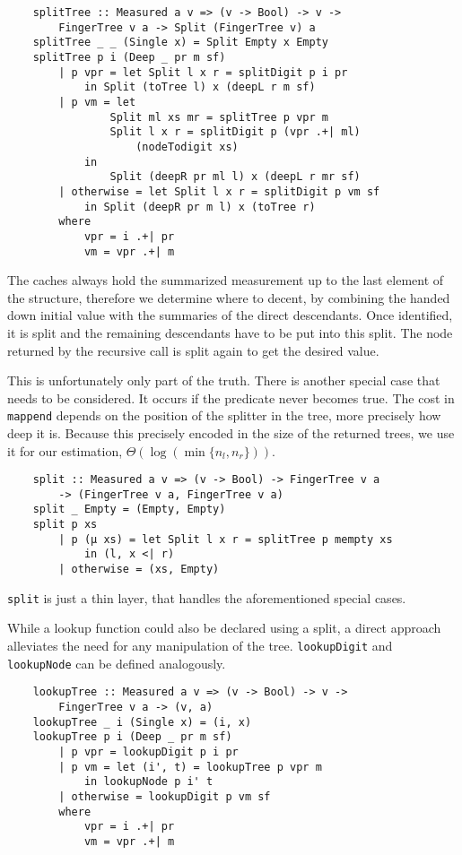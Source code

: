 \begin{verbatim}
    splitTree :: Measured a v => (v -> Bool) -> v ->
        FingerTree v a -> Split (FingerTree v) a
    splitTree _ _ (Single x) = Split Empty x Empty
    splitTree p i (Deep _ pr m sf)
        | p vpr = let Split l x r = splitDigit p i pr 
            in Split (toTree l) x (deepL r m sf)
        | p vm = let
                Split ml xs mr = splitTree p vpr m
                Split l x r = splitDigit p (vpr .+| ml)
                    (nodeTodigit xs)
            in
                Split (deepR pr ml l) x (deepL r mr sf)
        | otherwise = let Split l x r = splitDigit p vm sf
            in Split (deepR pr m l) x (toTree r)
        where
            vpr = i .+| pr
            vm = vpr .+| m
\end{verbatim}

The caches always hold the summarized measurement up to the last element of the structure, therefore we determine where to decent, by combining the handed down initial value with the summaries of the direct descendants. Once identified, it is split and the remaining descendants have to be put into this split. The node returned by the recursive call is split again to get the desired value.\par
This is unfortunately only part of the truth. There is another special case that needs to be considered. It occurs if the predicate never becomes true.
The cost in \texttt{mappend} depends on the position of the splitter in the tree,  more precisely how deep it is. Because this precisely encoded in the size of the returned trees, we use it for our estimation, \(\Theta(\log(\min\{n_l,n_r\}))\).

\begin{verbatim}
    split :: Measured a v => (v -> Bool) -> FingerTree v a
        -> (FingerTree v a, FingerTree v a)
    split _ Empty = (Empty, Empty)
    split p xs
        | p (μ xs) = let Split l x r = splitTree p mempty xs
            in (l, x <| r)
        | otherwise = (xs, Empty)
\end{verbatim}

\texttt{split} is just a thin layer, that handles the aforementioned special cases.\par
While a lookup function could also be declared using a split, a direct approach alleviates the need for any manipulation of the tree. \texttt{lookupDigit} and \texttt{lookupNode} can be defined analogously.

\begin{verbatim}
    lookupTree :: Measured a v => (v -> Bool) -> v ->
        FingerTree v a -> (v, a)
    lookupTree _ i (Single x) = (i, x)
    lookupTree p i (Deep _ pr m sf)
        | p vpr = lookupDigit p i pr
        | p vm = let (i', t) = lookupTree p vpr m
            in lookupNode p i' t
        | otherwise = lookupDigit p vm sf
        where
            vpr = i .+| pr
            vm = vpr .+| m
\end{verbatim}